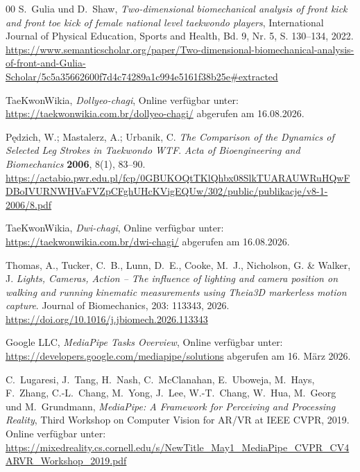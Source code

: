 \documentclass[intern]{cgMA}
\begin{document}
\begin{thebibliography}{00}
S.~Gulia und D.~Shaw,
\textit{Two-dimensional biomechanical analysis of front kick and front toe kick of female national level taekwondo players},
International Journal of Physical Education, Sports and Health, Bd. 9, Nr. 5, S. 130--134, 2022.
\href{https://www.semanticscholar.org/paper/Two-dimensional-biomechanical-analysis-of-front-and-Gulia-Scholar/5c5a35662600f7d4c74289a1c994e5161f38b25e\#extracted}{https://www.semanticscholar.org/paper/Two-dimensional-biomechanical-analysis-of-front-and-Gulia-Scholar/5c5a35662600f7d4c74289a1c994e5161f38b25e\#extracted}

TaeKwonWikia,
\textit{Dollyeo-chagi},
Online verfügbar unter:
\url{https://taekwonwikia.com.br/dollyeo-chagi/}
abgerufen am 16.08.2026.

Pędzich, W.; Mastalerz, A.; Urbanik, C.
\textit{The Comparison of the Dynamics of Selected Leg Strokes in Taekwondo WTF}.
\textit{Acta of Bioengineering and Biomechanics} \textbf{2006}, 8(1), 83--90.
\href{https://actabio.pwr.edu.pl/fcp/0GBUKOQtTKlQhbx08SlkTUARAUWRuHQwFDBoIVURNWHVaFVZpCFghUHcKVigEQUw/302/public/publikacje/v8-1-2006/8.pdf}{https://actabio.pwr.edu.pl/fcp/0GBUKOQtTKlQhbx08SlkTUARAUWRuHQwFDBoIVURNWHVaFVZpCFghUHcKVigEQUw/302/public/publikacje/v8-1-2006/8.pdf}

TaeKwonWikia,
\textit{Dwi-chagi},
Online verfügbar unter:
\url{https://taekwonwikia.com.br/dwi-chagi/}
abgerufen am 16.08.2026.

Thomas, A., Tucker, C.~B., Lunn, D.~E., Cooke, M.~J.,
Nicholson, G. \& Walker, J.
\textit{Lights, Cameras, Action -- The influence of lighting
and camera position on walking and running kinematic measurements
using Theia3D markerless motion capture}.
Journal of Biomechanics, 203: 113343, 2026.
\href{https://doi.org/10.1016/j.jbiomech.2026.113343}{https://doi.org/10.1016/j.jbiomech.2026.113343}

Google LLC,
\textit{MediaPipe Tasks Overview},
Online verfügbar unter:
\url{https://developers.google.com/mediapipe/solutions}
abgerufen am 16. März 2026.

C.~Lugaresi, J.~Tang, H.~Nash, C.~McClanahan, E.~Uboweja, M.~Hays, F.~Zhang,
C.-L.~Chang, M.~Yong, J.~Lee, W.-T.~Chang, W.~Hua, M.~Georg und M.~Grundmann,
\textit{MediaPipe: A Framework for Perceiving and Processing Reality},
Third Workshop on Computer Vision for AR/VR at IEEE CVPR, 2019.
Online verfügbar unter:
\url{https://mixedreality.cs.cornell.edu/s/NewTitle\_May1\_MediaPipe\_CVPR\_CV4ARVR\_Workshop\_2019.pdf}


\end{thebibliography}
\end{document}
